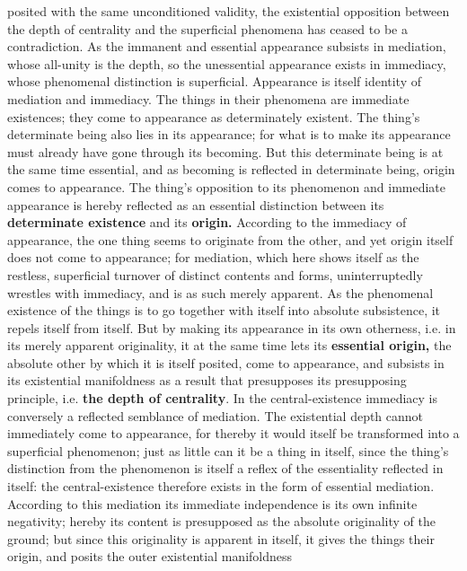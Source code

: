 \documentclass[12pt,a4paper,openany]{book}
\newcommand{\opage}[1]{\marginnote{\footnotesize\textit{[#1]}}}
\begin{document}
\opage{178}posited with the same unconditioned validity, the existential opposition between the depth of centrality and the superficial phenomena has ceased to be a contradiction. As the immanent and essential appearance subsists in mediation, whose all-unity is the depth, so the unessential appearance exists in immediacy, whose phenomenal distinction is superficial. Appearance is itself identity of mediation and immediacy. The things in their phenomena are immediate existences; they come to appearance as determinately existent. The thing's determinate being also lies in its appearance; for what is to make its appearance must already have gone through its becoming. But this determinate being is at the same time essential, and as becoming is reflected in determinate being, origin comes to appearance. The thing's opposition to its phenomenon and immediate appearance is hereby reflected as an essential distinction between its \textbf{determinate existence} and its \textbf{origin.} According to the immediacy of appearance, the one thing seems to originate from the other, and yet origin itself does not come to appearance; for mediation, which here shows itself as the restless, superficial turnover of distinct contents and forms, uninterruptedly wrestles with immediacy, and is as such merely apparent. As the phenomenal existence of the things is to go together with itself into absolute subsistence, it repels itself from itself. But by making its appearance in its own otherness, i.e. in its merely apparent originality, it at the same time lets its \textbf{essential origin,} the absolute other by which it is itself posited, come to appearance, and subsists in its existential manifoldness as a result that presupposes its presupposing principle, i.e. \textbf{the depth of centrality}.
\setcounter{footnote}{0}%
\opage{179}In the central-existence immediacy is conversely a
reflected semblance of mediation. The existential depth cannot
immediately come to appearance, for thereby it would
itself be transformed into a superficial phenomenon; just as little
can it be a thing in itself, since the thing's distinction from
the phenomenon is itself a reflex of the essentiality reflected
in itself: the central-existence therefore exists in the form of
essential mediation. According to this mediation its
immediate independence is its own infinite negativity;
hereby its content is presupposed as the absolute originality
of the ground; but since this originality
is apparent in itself, it gives the things their
origin, and posits the outer existential manifoldness
\end{document}
